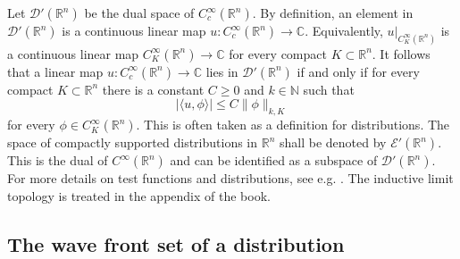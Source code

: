 \documentclass[10pt,a4paper]{article}
\theoremstyle{plain}
\theoremstyle{definition}
\theoremstyle{remark}
\numberwithin{equation}{section}
\newcommand{\R}{\mathbb{R}}
\newcommand{\C}{\mathbb{C}}
\newcommand{\N}{\mathbb{N}}
\begin{document}
Let $\mathcal{D}'(\R^n)$ be the dual space of $C^\infty_c (\R^n)$. 
By definition, an element in $ \mathcal{D}'(\R^n)$ is a continuous linear map $u : C^\infty_c (\R^n) \to \C $. Equivalently, $u |_{C^\infty_K (\R^n)}$  is a continuous linear map $C^\infty_K (\R^n) \to \C $ for every compact $K \subset \R^n$. 
It follows that a linear map 
$u : C^\infty_c ( \R^n) \to \C $ lies in $\mathcal{D}'(\R^n)$  if and only if 
for every compact $K \subset \R^n$ there is a constant $C\geq 0$
and $k \in \N$ such that 
\begin{equation}\label{distiey}
| \langle u, \phi \rangle | \leq C \| \phi \|_{k,K}  
\end{equation}
for every $\phi \in C_K^\infty(\R^n)$.
This is often taken as a definition for distributions. The space of compactly supported distributions in $\R^n$ shall be denoted by $\mathcal{E}'(\R^n)$. This is the dual of $C^\infty (\R^n)$ and can be identified as a subspace of $\mathcal{D}'(\R^n)$.
%
For more details on test functions and distributions, see e.g. \cite{friedlander-joshi-book}. The inductive limit topology is treated in the appendix of the book.  

\subsection{The wave front set of a distribution}
\end{document}
